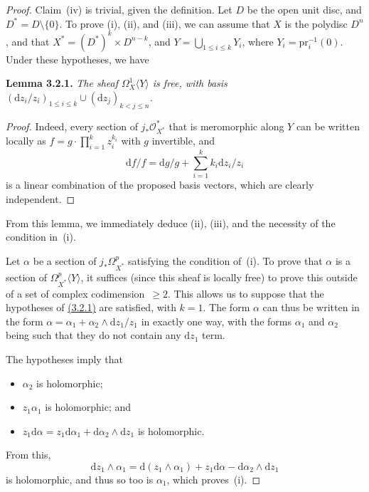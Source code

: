 \documentclass{report}
\newenvironment{itenv}[1]
  {\phantomsection\par\medskip\noindent\textbf{#1.}\itshape}
  {\par\medskip}
\renewcommand{\cal}[1]{{\mathcal{#1}}}
\newcommand{\dd}{\mathrm{d}}
\newcommand{\pr}{\mathrm{pr}}
\renewcommand{\geq}{\geqslant}
\renewcommand{\leq}{\leqslant}
\newcommand{\oldpage}[1]{\marginpar{\footnotesize$\Big\vert$ \textit{p.~#1}}}
\begin{document}
\oldpage{73}
\begin{proof}
  Claim~(iv) is trivial, given the definition.
  Let $D$ be the open unit disc, and $D^*=D\setminus\{0\}$.
  To prove (i), (ii), and (iii), we can assume that $X$ is the polydisc $D^n$, and that $X^*=(D^*)^k\times D^{n-k}$, and $Y=\bigcup_{1\leq i\leq k}Y_i$, where $Y_i=\pr_i^{-1}(0)$.
  Under these hypotheses, we have

  \begin{itenv}{Lemma 3.2.1}
  \label{II.3.2.1}
    The sheaf $\Omega_X^1\langle Y\rangle$ is free, with basis $(\dd z_i/z_i)_{1\leq i\leq k}\cup(\dd z_j)_{k<j\leq n}$.
  \end{itenv}

  \begin{proof}
    Indeed, every section of $j_*\cal{O}_{X^*}^*$ that is meromorphic along $Y$ can be written locally as $f=g\cdot\prod_{i=1}^k z_i^{k_i}$ with $g$ invertible, and
    \[
      \dd f/f = \dd g/g + \sum_{i=1}^k k_i\dd z_i/z_i
    \]
    is a linear combination of the proposed basis vectors, which are clearly independent.
  \end{proof}

  From this lemma, we immediately deduce (ii), (iii), and the necessity of the condition in~(i).

  Let $\alpha$ be a section of $j_*\Omega_{X^*}^p$ satisfying the condition of~(i).
  To prove that $\alpha$ is a section of $\Omega_{X^*}^p\langle Y\rangle$, it suffices (since this sheaf is locally free) to prove this outside of a set of complex codimension~$\geq2$.
  This allows us to suppose that the hypotheses of \hyperref[II.3.2.1]{(3.2.1)} are satisfied, with $k=1$.
  The form $\alpha$ can thus be written in the form $\alpha=\alpha_1+\alpha_2\wedge\dd z_1/z_1$ in exactly one way, with the forms $\alpha_1$ and $\alpha_2$ being such that they do not contain any $\dd z_1$ term.

  The hypotheses imply that
  \begin{itemize}
    \item $\alpha_2$ is holomorphic;
    \item $z_1\alpha_1$ is holomorphic; and
    \item $z_1\dd\alpha = z_1\dd\alpha_1+\dd\alpha_2\wedge\dd z_1$ is holomorphic.
  \end{itemize}

  From this,
  \[
    \dd z_1\wedge\alpha_1 = \dd(z_1\wedge\alpha_1) + z_1\dd\alpha - \dd\alpha_2\wedge\dd z_1
  \]
  is holomorphic, and thus so too is $\alpha_1$, which proves~(i).
\end{proof}
\end{document}
